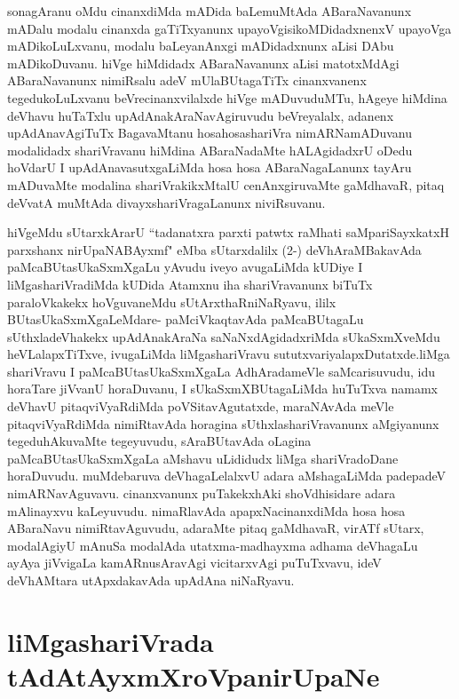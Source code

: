 \begin{artha}
sonagAranu oMdu cinanxdiMda mADida baLemuMtAda ABaraNavanunx mADalu modalu cinanxda gaTiTxyanunx upayoVgisikoMDidadxnenxV upayoVga mADikoLuLxvanu, modalu baLeyanAnxgi mADidadxnunx aLisi DAbu mADikoDuvanu. hiVge hiMdidadx ABaraNavanunx aLisi matotxMdAgi ABaraNavanunx nimiRsalu adeV mUlaBUtagaTiTx cinanxvanenx tegedukoLuLxvanu beVrecinanxvilalxde hiVge mADuvuduMTu, hAgeye hiMdina deVhavu huTaTxlu upAdAnakAraNavAgiruvudu beVreyalalx, adanenx upAdAnavAgiTuTx BagavaMtanu hosahosashariVra nimARNamADuvanu modalidadx shariVravanu hiMdina ABaraNadaMte hALAgidadxrU oDedu hoVdarU I upAdAnavasutxgaLiMda hosa hosa ABaraNagaLanunx tayAru mADuvaMte modalina shariVrakikxMtalU cenAnxgiruvaMte gaMdhavaR, pitaq deVvatA muMtAda divayxshariVragaLanunx niviRsuvanu. 

hiVgeMdu sUtarxkArarU ``tadanatxra parxti patwtx raMhati saMpariSayxkatxH parxshanx nirUpaNABAyxmf" eMba sUtarxdalilx (2-) deVhAraMBakavAda paMcaBUtasUkaSxmXgaLu yAvudu iveyo avugaLiMda kUDiye I liMgashariVradiMda kUDida Atamxnu iha shariVravanunx biTuTx paraloVkakekx hoVguvaneMdu sUtArxthaRniNaRyavu, ililx BUtasUkaSxmXgaLeMdare- paMciVkaqtavAda paMcaBUtagaLu sUthxladeVhakekx upAdAnakAraNa saNaNxdAgidadxriMda sUkaSxmXveMdu heVLalapxTiTxve, ivugaLiMda liMgashariVravu sututxvariyalapxDutatxde.liMga shariVravu I paMcaBUtasUkaSxmXgaLa AdhAradameVle saMcarisuvudu, idu horaTare jiVvanU horaDuvanu, I sUkaSxmXBUtagaLiMda huTuTxva namamx deVhavU pitaqviVyaRdiMda poVSitavAgutatxde, maraNAvAda meVle pitaqviVyaRdiMda nimiRtavAda horagina sUthxlashariVravanunx aMgiyanunx tegeduhAkuvaMte tegeyuvudu, sAraBUtavAda oLagina paMcaBUtasUkaSxmXgaLa aMshavu uLididudx liMga shariVradoDane horaDuvudu. muMdebaruva deVhagaLelalxvU adara aMshagaLiMda padepadeV nimARNavAguvavu. cinanxvanunx puTakekxhAki shoVdhisidare adara mAlinayxvu kaLeyuvudu. nimaRlavAda apapxNacinanxdiMda hosa hosa ABaraNavu nimiRtavAguvudu, adaraMte pitaq gaMdhavaR, virATf sUtarx, modalAgiyU mAnuSa modalAda utatxma-madhayxma adhama deVhagaLu ayAya jiVvigaLa kamARnusAravAgi vicitarxvAgi puTuTxvavu, ideV deVhAMtara utApxdakavAda upAdAna niNaRyavu.
\end{artha}

\section*{liMgashariVrada tAdAtAyxmXroVpanirUpaNe}

